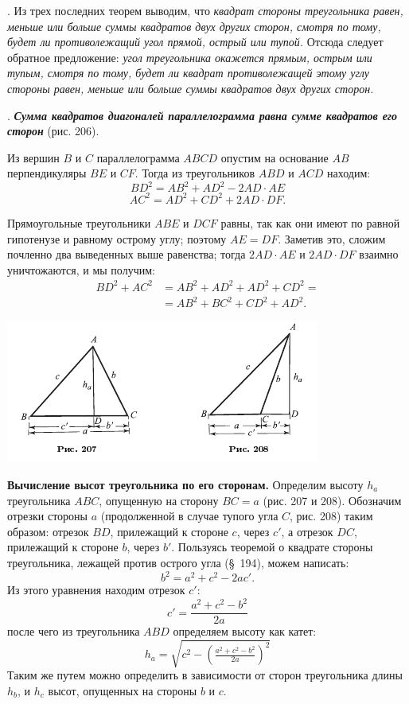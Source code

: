 \documentclass[oneside]{book}
\begin{document}
.
Из трех последних теорем выводим, что \emph{квадрат стороны треугольника равен, меньше или больше суммы квадратов двух других сторон, смотря по тому, будет ли противолежащий угол прямой, острый или тупой.}
Отсюда следует обратное предложение:
\emph{угол треугольника окажется прямым, острым или тупым, смотря по тому, будет ли квадрат противолежащей этому углу стороны равен, меньше или больше суммы квадратов двух других сторон.}

.
\textbf{\emph{Сумма квадратов диагоналей параллелограмма равна сумме квадратов его сторон}} (рис. 206).

Из вершин $B$ и $C$ параллелограмма $ABCD$ опустим на основание $AB$ перпендикуляры $BE$ и $CF$.
Тогда из треугольников $ABD$ и $ACD$ находим:
\[BD^2=AB^2+AD^2-2AD\cdot AE\]
\[AC^2=AD^2+CD^2+2AD\cdot  DF.\]

Прямоугольные треугольники $ABE$ и $DCF$ равны, так как они имеют по равной гипотенузе и равному острому углу;
поэтому $AE=DF$.
Заметив это, сложим почленно два выведенных выше равенства;
тогда $2AD\cdot  AE$ и $2AD\cdot  DF$ взаимно уничтожаются, и мы получим:
\begin{align*}
BD^2+AC^2&=AB^2+AD^2+AD^2+CD^2=
\\
&=AB^2+BC^2+CD^2+AD^2.
\end{align*}

\includegraphics{pics/ris-207-208}

\textbf{Вычисление высот треугольника по его сторонам.}
Определим высоту $h_a$ треугольника $ABC$, опущенную на сторону $BC=a$ (рис. 207 и 208).
Обозначим отрезки стороны $a$ (продолженной в случае тупого угла $C$, рис. 208) таким образом:
отрезок $BD$, прилежащий к стороне $c$, через $c'$, а отрезок $DC$, прилежащий к стороне $b$, через $b'$.
Пользуясь теоремой о квадрате стороны треугольника, лежащей против острого угла (§~194), можем написать:
\[b^2=a^2+c^2-2ac'.\]
Из этого уравнения находим отрезок $c'$:
\[c'=\frac{a^2+c^2-b^2}{2a}\]
после чего из треугольника $ABD$ определяем высоту как катет:
\[h_a=\sqrt{c^2-\left(\tfrac{a^2+c^2-b^2}{2a}\right)^2}\]
Таким же путем можно определить в зависимости от сторон треугольника длины $h_b$, и $h_c$ высот, опущенных на стороны $b$ и $c$.
\end{document}
